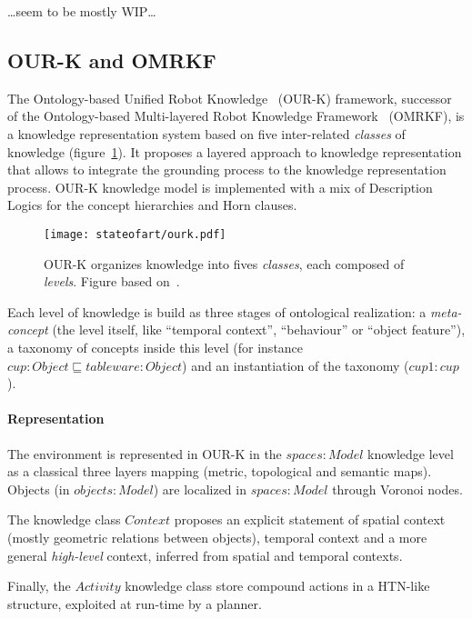 \ldots seem to be mostly WIP\ldots

\subsection{OUR-K and OMRKF}
\label{sect|omrkf}

The Ontology-based Unified Robot Knowledge~\cite{Lim2011} (OUR-K) framework,
successor of the Ontology-based Multi-layered Robot Knowledge
Framework~\cite{Suh2007} (OMRKF), is a knowledge representation system based on
five inter-related \emph{classes} of knowledge (figure~\ref{fig|omrkf}). It
proposes a layered approach to knowledge representation that allows to
integrate the grounding process to the knowledge representation process. OUR-K
knowledge model is implemented with a mix of Description Logics for the concept
hierarchies and Horn clauses.

\begin{figure}
    \centering
    \texttt{[image: stateofart/ourk.pdf]}

    \caption{OUR-K organizes knowledge into fives \emph{classes}, each composed
    of \emph{levels}. Figure based on~\cite{Lim2011}.}

    \label{fig|omrkf}
\end{figure}

Each level of knowledge is build as three stages of ontological realization: a
\emph{meta-concept} (the level itself, like ``temporal context'', ``behaviour''
or ``object feature''), a taxonomy of concepts inside this level (for instance
$cup : Object \sqsubseteq tableware : Object$) and an instantiation of the
taxonomy ($cup1 : cup$).

\paragraph{Representation} The environment is represented in OUR-K in the
$spaces : Model$ knowledge level as a classical three layers mapping (metric,
topological and semantic maps). Objects (in $objects : Model$) are localized in
$spaces : Model$ through Voronoi nodes.

The knowledge class $Context$ proposes an explicit statement of spatial context
(mostly geometric relations between objects), temporal context and a more
general \emph{high-level} context, inferred from spatial and temporal contexts.

Finally, the $Activity$ knowledge class store compound actions in a HTN-like
structure, exploited at run-time by a planner.

